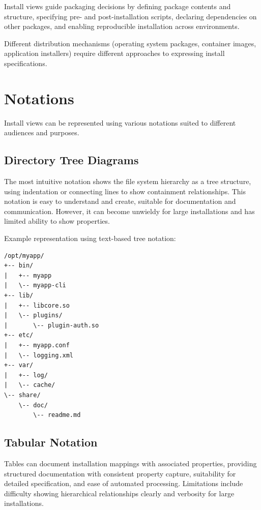 \documentclass[11pt]{article}
\begin{document}
Install views guide packaging decisions by defining package contents and structure, specifying pre- and post-installation scripts, declaring dependencies on other packages, and enabling reproducible installation across environments.

Different distribution mechanisms (operating system packages, container images, application installers) require different approaches to expressing install specifications.

\section{Notations}

Install views can be represented using various notations suited to different audiences and purposes.

\subsection{Directory Tree Diagrams}

The most intuitive notation shows the file system hierarchy as a tree structure, using indentation or connecting lines to show containment relationships. This notation is easy to understand and create, suitable for documentation and communication. However, it can become unwieldy for large installations and has limited ability to show properties.

Example representation using text-based tree notation:

\begin{verbatim}
/opt/myapp/
+-- bin/
|   +-- myapp
|   \-- myapp-cli
+-- lib/
|   +-- libcore.so
|   \-- plugins/
|       \-- plugin-auth.so
+-- etc/
|   +-- myapp.conf
|   \-- logging.xml
+-- var/
|   +-- log/
|   \-- cache/
\-- share/
    \-- doc/
        \-- readme.md
\end{verbatim}

\subsection{Tabular Notation}

Tables can document installation mappings with associated properties, providing structured documentation with consistent property capture, suitability for detailed specification, and ease of automated processing. Limitations include difficulty showing hierarchical relationships clearly and verbosity for large installations.
\end{document}
